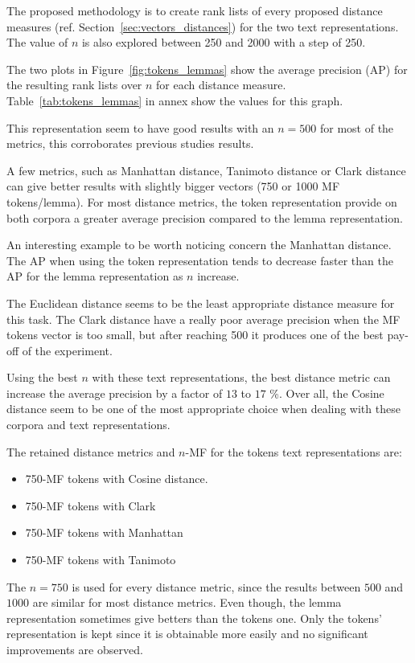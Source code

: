 The proposed methodology is to create rank lists of every proposed distance measures (ref. Section~\ref{sec:vectors_distances}) for the two text representations.
The value of $n$ is also explored between 250 and 2000 with a step of 250.

The two plots in Figure~\ref{fig:tokens_lemmas} show the average precision (AP) for the resulting rank lists over $n$ for each distance measure.
Table~\ref{tab:tokens_lemmas} in annex show the values for this graph.

This representation seem to have good results with an $n=500$ for most of the metrics, this corroborates previous studies results.

A few metrics, such as Manhattan distance, Tanimoto distance or Clark distance can give better results with slightly bigger vectors (750 or 1000 MF tokens/lemma).
For most distance metrics, the token representation provide on both corpora a greater average precision compared to the lemma representation.

An interesting example to be worth noticing concern the Manhattan distance.
The AP when using the token representation tends to decrease faster than the AP for the lemma representation as $n$ increase.

The Euclidean distance seems to be the least appropriate distance measure for this task.
The Clark distance have a really poor average precision when the MF tokens vector is too small, but after reaching 500 it produces one of the best pay-off of the experiment.

Using the best $n$ with these text representations, the best distance metric can increase the average precision by a factor of $13$ to $17$ \%.
Over all, the Cosine distance seem to be one of the most appropriate choice when dealing with these corpora and text representations.

The retained distance metrics and $n$-MF for the tokens text representations are:
\begin{itemize}
  \item 750-MF tokens with Cosine distance.
  \item 750-MF tokens with Clark
  \item 750-MF tokens with Manhattan
  \item 750-MF tokens with Tanimoto
\end{itemize}

The $n = 750$ is used for every distance metric, since the results between $500$ and $1000$ are similar for most distance metrics.
Even though, the lemma representation sometimes give betters than the tokens one.
Only the tokens' representation is kept since it is obtainable more easily and no significant improvements are observed.

